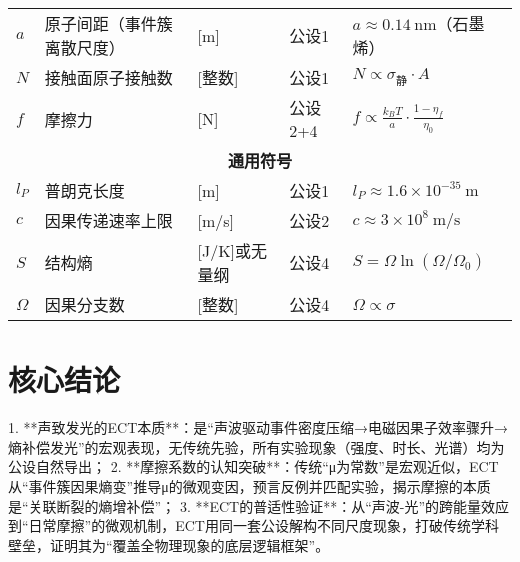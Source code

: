 \documentclass{article}
\begin{document}
\begin{table}[h!]
{\begin{tabular}{l l l l l}
$a$                  & 原子间距（事件簇离散尺度）      & [m]                & 公设1                  & $a \approx 0.14\ \text{nm}$（石墨烯） \\
$N$                  & 接触面原子接触数                & [整数]             & 公设1                  & $N \propto \sigma_{\text{静}} \cdot A$ \\
$f$                  & 摩擦力                          & [N]                & 公设2+4                & $f \propto \frac{k_B T}{a} \cdot \frac{1 - \eta_f}{\eta_0}$ \\
\midrule
\multicolumn{5}{c}{\textbf{通用符号}} \\
\midrule
$l_P$                & 普朗克长度                      & [m]                & 公设1                  & $l_P \approx 1.6×10^{-35}\ \text{m}$ \\
$c$                  & 因果传递速率上限                & [m/s]              & 公设2                  & $c \approx 3×10^8\ \text{m/s}$ \\
$S$                  & 结构熵                          & [J/K]或无量纲      & 公设4                  & $S = \Omega \ln(\Omega/\Omega_0)$ \\
$\Omega$             & 因果分支数                      & [整数]             & 公设4                  & $\Omega \propto \sigma$ \\
\bottomrule
\end{tabular}%
}
\end{table}


\section{核心结论}
1. **声致发光的ECT本质**：是“声波驱动事件密度压缩→电磁因果子效率骤升→熵补偿发光”的宏观表现，无传统先验，所有实验现象（强度、时长、光谱）均为公设自然导出；
2. **摩擦系数的认知突破**：传统“μ为常数”是宏观近似，ECT从“事件簇因果熵变”推导μ的微观变因，预言反例并匹配实验，揭示摩擦的本质是“关联断裂的熵增补偿”；
3. **ECT的普适性验证**：从“声波-光”的跨能量效应到“日常摩擦”的微观机制，ECT用同一套公设解构不同尺度现象，打破传统学科壁垒，证明其为“覆盖全物理现象的底层逻辑框架”。
\end{document}
